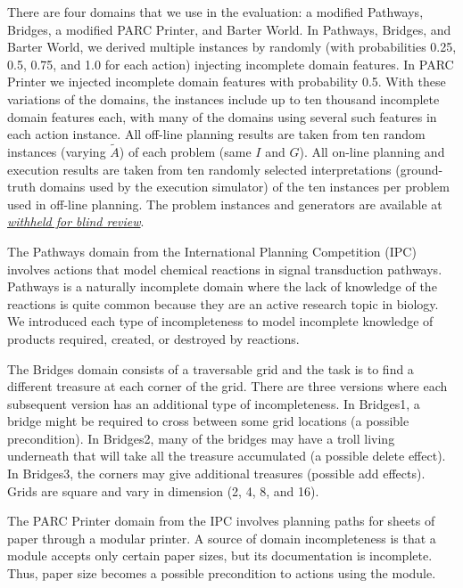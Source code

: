 \documentclass{article}
\def\citep#1{\cite{#1}}
\def\und#1{\noindent{\bf #1}:}
\def\und#1{\medskip{\noindent\bf #1:}}
\begin{document}
\und{Domains} There are four domains that we use in the evaluation: a modified Pathways, Bridges,  a modified PARC Printer, and Barter World.  In Pathways, Bridges, and Barter World, we derived multiple instances by randomly (with probabilities 0.25, 0.5, 0.75, and 1.0 for each action) injecting incomplete domain features.   In PARC Printer we injected incomplete domain features with probability 0.5. With these variations of the domains, the instances include up to ten thousand incomplete domain features each, with many of the domains using several such features in each action instance. All off-line planning results are taken from ten random instances (varying $\tilde{A}$) of each problem (same $I$ and $G$).  All on-line planning and execution results are taken from ten randomly selected interpretations (ground-truth domains used by the execution simulator) of the ten instances per problem used in off-line planning.
The problem instances and generators are available at \href{}{\it withheld for blind review}.

The Pathways domain from the International Planning Competition  (IPC) \citep{ipc} involves actions that model chemical reactions in signal transduction pathways.  Pathways is a naturally incomplete domain where the lack of knowledge of the reactions is quite common because they are an active research topic in biology.  We introduced each type of incompleteness to model incomplete knowledge of products required, created, or destroyed by reactions.

The Bridges domain consists of a traversable grid and the task is to find a different treasure at each corner of the grid. There are three versions where each subsequent version has an additional type of incompleteness.  In Bridges1, a bridge might be required  to cross between some grid locations (a possible precondition). In Bridges2, many of the bridges may have a troll living underneath that will take all the treasure accumulated (a possible delete effect). In Bridges3, the corners may give additional treasures (possible add effects).  Grids are square and vary in dimension (2, 4, 8, and 16).

The PARC Printer domain from the IPC involves planning paths for sheets of paper through a modular printer.  A source of domain incompleteness is that a module accepts only certain paper sizes, but its documentation is incomplete.  Thus, paper size becomes a possible precondition to actions using the module.  
\end{document}
